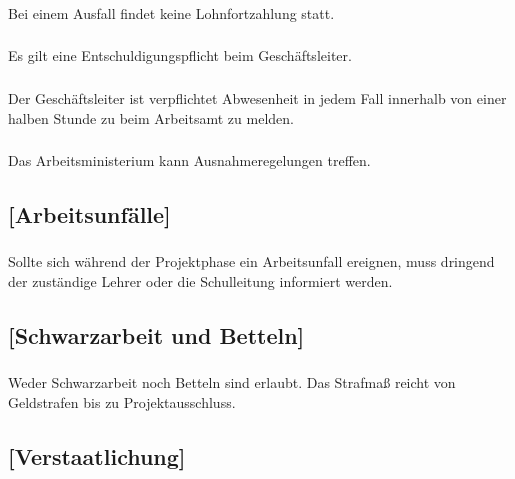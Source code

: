 \documentclass[a4paper, 11pt]{report}
\let\oldsubsection\subsection
\renewcommand{\subsection}{\leftskip=40pt\oldsubsection}
\begin{document}
\subsubsection{}
Bei einem Ausfall findet keine Lohnfortzahlung statt. 

\subsubsection{}
Es gilt eine Entschuldigungspflicht beim Geschäftsleiter.  

\subsubsection{}
Der Geschäftsleiter ist verpflichtet Abwesenheit in jedem Fall innerhalb von einer halben Stunde zu beim Arbeitsamt zu melden.

\subsubsection{}
Das Arbeitsministerium kann Ausnahmeregelungen treffen. 

 

\subsection{[Arbeitsunfälle]}

 
\subsubsection{}
Sollte sich während der Projektphase ein Arbeitsunfall ereignen, muss dringend der zuständige Lehrer oder die Schulleitung informiert werden.
 

\subsection{[Schwarzarbeit und Betteln]}

 
\subsubsection{}
Weder Schwarzarbeit noch Betteln sind erlaubt. Das Strafmaß reicht von Geldstrafen bis zu Projektausschluss.  

 

\subsection{[Verstaatlichung]}
\end{document}
